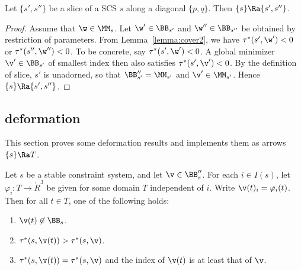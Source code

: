 \begin{lemma}[slice]  Let $\{s',s''\}$ be a slice of
a SCS $s$ along
a diagonal $\{p,q\}$.  
Then   $\{s\}\Ra\{s',s''\}$.
\end{lemma}

\begin{proof}
Assume that $\w\in\MM_s$.
Let $\w'\in \BB_{s'}$ and $\w''\in \BB_{s''}$ be obtained
by restriction of parameters.  From Lemma~\ref{lemma:cover2},
we have $\tau^*(s',\w')< 0$ or $\tau^*(s'',\w'')<0$.  To be
concrete, say $\tau^*(s',\w')< 0$.  A global minimizer $\v'\in\BB_{s'}$ of smallest index
then also satisfies $\tau^*(s',\v')< 0$.  By the definition of
slice, $s'$ is unadorned, so that $\BB''_{s'}=\MM_{s'}$ and
$\v'\in \MM_{s'}$.  Hence $\{s\}\Ra\{s',s''\}$.
\end{proof}


\subsection{deformation}

This section proves some deformation results and implements them
as arrows $\{s\}\Ra T$.

\begin{lemma} 
Let $s$ be a stable constraint system, and let $\v\in\BB''_s$.  For
each $i\in I(s)$, let $\varphi_i:T\to\ring{R}^3$
be given for some domain $T$ independent of $i$.  Write $\v(t)_i = \varphi_i(t)$. 
Then for all $t\in T$, one of the following holds:
\begin{enumerate}
\item $\v(t)\not\in \BB_s$.
\item $\tau^*(s,\v(t))> \tau^*(s,\v)$.
\item $\tau^*(s,\v(t))=\tau^*(s,\v)$ and the index of $\v(t)$ is at least that of $\v$.
\end{enumerate}
\end{lemma}

